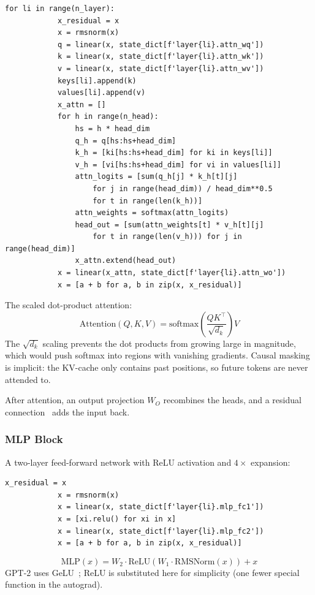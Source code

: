 \documentclass[11pt,a4paper]{article}
\begin{document}
\begin{lstlisting}[firstnumber=169]
        for li in range(n_layer):
            x_residual = x
            x = rmsnorm(x)
            q = linear(x, state_dict[f'layer{li}.attn_wq'])
            k = linear(x, state_dict[f'layer{li}.attn_wk'])
            v = linear(x, state_dict[f'layer{li}.attn_wv'])
            keys[li].append(k)
            values[li].append(v)
            x_attn = []
            for h in range(n_head):
                hs = h * head_dim
                q_h = q[hs:hs+head_dim]
                k_h = [ki[hs:hs+head_dim] for ki in keys[li]]
                v_h = [vi[hs:hs+head_dim] for vi in values[li]]
                attn_logits = [sum(q_h[j] * k_h[t][j]
                    for j in range(head_dim)) / head_dim**0.5
                    for t in range(len(k_h))]
                attn_weights = softmax(attn_logits)
                head_out = [sum(attn_weights[t] * v_h[t][j]
                    for t in range(len(v_h))) for j in range(head_dim)]
                x_attn.extend(head_out)
            x = linear(x_attn, state_dict[f'layer{li}.attn_wo'])
            x = [a + b for a, b in zip(x, x_residual)]
\end{lstlisting}

The scaled dot-product attention:
\[
\text{Attention}(Q, K, V) = \text{softmax}\!\left(\frac{QK^\top}{\sqrt{d_k}}\right) V
\]
The $\sqrt{d_k}$ scaling prevents the dot products from growing large in magnitude, which would push softmax into regions with vanishing gradients. Causal masking is implicit: the KV-cache only contains past positions, so future tokens are never attended to.

After attention, an output projection $W_O$ recombines the heads, and a residual connection~\cite{he2016deep} adds the input back.

\subsubsection{MLP Block}

A two-layer feed-forward network with ReLU activation and $4\times$ expansion:

\begin{lstlisting}[firstnumber=192]
            x_residual = x
            x = rmsnorm(x)
            x = linear(x, state_dict[f'layer{li}.mlp_fc1'])
            x = [xi.relu() for xi in x]
            x = linear(x, state_dict[f'layer{li}.mlp_fc2'])
            x = [a + b for a, b in zip(x, x_residual)]
\end{lstlisting}
\[
\text{MLP}(x) = W_2 \cdot \text{ReLU}(W_1 \cdot \text{RMSNorm}(x)) + x
\]
GPT-2 uses GeLU~\cite{hendrycks2016gaussian}; ReLU is substituted here for simplicity (one fewer special function in the autograd).
\end{document}
